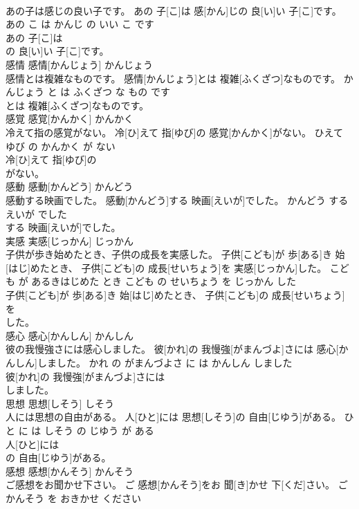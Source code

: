 \documentclass[8pt]{extreport}
\begin{document}
\begin{CJK}{UTF8}{min}
\\	あの子は感じの良い子です。	あの 子[こ]は 感[かん]じの 良[い]い 子[こ]です。	あの こ は かんじ の いい こ です	
\\	あの 子[こ]は
\\	の 良[い]い 子[こ]です。			
\\	感情	感情[かんじょう]	かんじょう	
\\	感情とは複雑なものです。	感情[かんじょう]とは 複雑[ふくざつ]なものです。	かんじょう と は ふくざつ な もの です	
\\	とは 複雑[ふくざつ]なものです。			
\\	感覚	感覚[かんかく]	かんかく	
\\	冷えて指の感覚がない。	冷[ひ]えて 指[ゆび]の 感覚[かんかく]がない。	ひえて ゆび の かんかく が ない	
\\	冷[ひ]えて 指[ゆび]の
\\	がない。			
\\	感動	感動[かんどう]	かんどう	
\\	感動する映画でした。	感動[かんどう]する 映画[えいが]でした。	かんどう する えいが でした	
\\	する 映画[えいが]でした。			
\\	実感	実感[じっかん]	じっかん	
\\	子供が歩き始めたとき、子供の成長を実感した。	子供[こども]が 歩[ある]き 始[はじ]めたとき、 子供[こども]の 成長[せいちょう]を 実感[じっかん]した。	こども が あるきはじめた とき こども の せいちょう を じっかん した	
\\	子供[こども]が 歩[ある]き 始[はじ]めたとき、 子供[こども]の 成長[せいちょう]を
\\	した。			
\\	感心	感心[かんしん]	かんしん	
\\	彼の我慢強さには感心しました。	彼[かれ]の 我慢強[がまんづよ]さには 感心[かんしん]しました。	かれ の がまんづよさ に は かんしん しました	
\\	彼[かれ]の 我慢強[がまんづよ]さには
\\	しました。			
\\	思想	思想[しそう]	しそう	
\\	人には思想の自由がある。	人[ひと]には 思想[しそう]の 自由[じゆう]がある。	ひと に は しそう の じゆう が ある	
\\	人[ひと]には
\\	の 自由[じゆう]がある。			
\\	感想	感想[かんそう]	かんそう	
\\	ご感想をお聞かせ下さい。	ご 感想[かんそう]をお 聞[き]かせ 下[くだ]さい。	ごかんそう を おきかせ ください	

\end{CJK}
\end{document}
